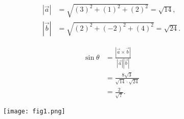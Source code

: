 \documentclass[journal]{IEEEtran}
\begin{document}
\begin{align}
|\vec{a}| &= \sqrt{(3)^2 + (1)^2 + (2)^2} = \sqrt{14}, \\
|\vec{b}| &= \sqrt{(2)^2 + (-2)^2 + (4)^2} = \sqrt{24}.
\end{align}

\begin{align}
\sin\theta &= \frac{|\vec{a} \times \vec{b}|}{|\vec{a}||\vec{b}|} \\
&= \frac{8\sqrt{3}}{\sqrt{14}\cdot \sqrt{24}} \\
&= \frac{2}{\sqrt{7}}.
\end{align}


\begin{figure}[h!]
   \centering
   \texttt{[image: fig1.png]}
   \caption{}
   \label{stemplot}
\end{figure}
\end{document}
